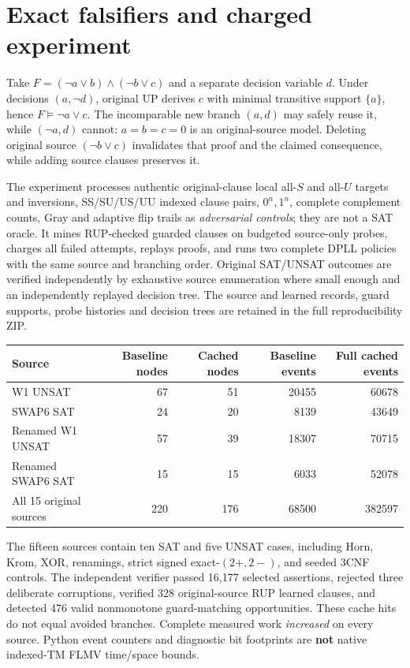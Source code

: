 \documentclass[11pt]{article}
\begin{document}
\section{Exact falsifiers and charged experiment}
Take $F=(\neg a\vee b)\wedge(\neg b\vee c)$ and a separate decision
variable $d$. Under decisions $(a,\neg d)$, original UP derives $c$
with minimal transitive support $\{a\}$, hence $F\models\neg a\vee c$.
The incomparable new branch $(a,d)$ may safely reuse it, while
$(\neg a,d)$ cannot: $a=b=c=0$ is an original-source model.
Deleting original source $(\neg b\vee c)$ invalidates that proof and
the claimed consequence, while adding source clauses preserves it.

The experiment processes authentic original-clause local all-$S$ and
all-$U$ targets and inversions, SS/SU/US/UU indexed clause pairs,
$0^n,1^n$, complete complement counts, Gray and adaptive flip trails
as \emph{adversarial controls}; they are not a SAT oracle. It mines
RUP-checked guarded clauses on budgeted source-only probes, charges all
failed attempts, replays proofs, and runs two complete DPLL policies
with the same source and branching order. Original SAT/UNSAT outcomes
are verified independently by exhaustive source enumeration where
small enough and an independently replayed decision tree.
The source and learned records, guard supports, probe histories and
decision trees are retained in the full reproducibility ZIP.
\begin{center}
\begin{tabular}{lrrrr}\toprule
Source & Baseline nodes & Cached nodes & Baseline events & Full cached events\\\midrule
W1 UNSAT &67&51&20455&60678\\
SWAP6 SAT &24&20&8139&43649\\
Renamed W1 UNSAT &57&39&18307&70715\\
Renamed SWAP6 SAT &15&15&6033&52078\\
All 15 original sources &220&176&68500&382597\\
\bottomrule\end{tabular}
\end{center}
The fifteen sources contain ten SAT and five UNSAT cases, including
Horn, Krom, XOR, renamings, strict signed exact-$(2+,2-)$, and seeded
3CNF controls. The independent verifier passed 16,177 selected
assertions, rejected three deliberate corruptions, verified 328
original-source RUP learned clauses, and detected 476 valid
nonmonotone guard-matching opportunities. These cache hits do not
equal avoided branches. Complete measured work \emph{increased}
on every source. Python event counters and diagnostic bit footprints
are \textbf{not} native indexed-TM FLMV time/space bounds.
\end{document}
